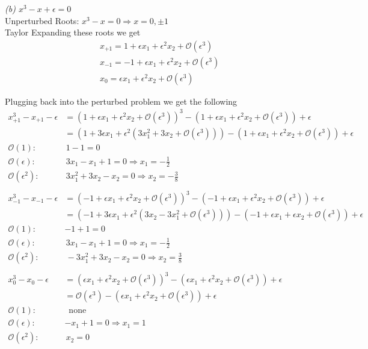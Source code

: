\documentclass[12pt]{article}
\theoremstyle{remark}
\begin{document}
\newpage

\textit{(b) $x^3 - x + \epsilon = 0$} \\

Unperturbed Roots: $x^3 - x = 0 \Rightarrow x = 0, \pm 1$ \\
Taylor Expanding these roots we get
\begin{align*}
 & x_{+1} = 1 + \epsilon x_1 + \epsilon^2 x_2 + \mathcal{O}(\epsilon^3) \\
 & x_{-1} = -1 + \epsilon x_1 + \epsilon^2 x_2 + \mathcal{O}(\epsilon^3) \\ 
 & x_{0} = \epsilon x_1 + \epsilon^2 x_2 + \mathcal{O}(\epsilon^3)  
\end{align*}

Plugging back into the perturbed problem we get the following  
\begin{align*}
	x_{+1}^3 - x_{+1} - \epsilon & = (1 + \epsilon x_1 + \epsilon^2 x_2 + \mathcal{O}(\epsilon^3))^3 - (1 + \epsilon x_1 + \epsilon^2 x_2 + \mathcal{O}(\epsilon^3)) + \epsilon \\
	& = (1 + 3\epsilon x_1 + \epsilon^2(3x_1^2 + 3x_2 + \mathcal{O}(\epsilon^3))) - (1 + \epsilon x_1 + \epsilon^2x_2 + \mathcal{O}(\epsilon^3)) + \epsilon \\
	\mathcal{O}(1): & \, 1- 1 = 0 \\
	\mathcal{O}(\epsilon): & \, 3x_1 - x_1 + 1 = 0 \Rightarrow x_1 = -\frac{1}{2} \\
	\mathcal{O}(\epsilon^2): & \, 3x_1^2 + 3x_2 - x_2 = 0 \Rightarrow x_2 = -\frac{3}{8} \\ \\
	x_{-1}^3 - x_{-1} - \epsilon & = (-1 + \epsilon x_1 + \epsilon^2 x_2 + \mathcal{O}(\epsilon^3))^3 - (-1 + \epsilon x_1 + \epsilon^2 x_2 + \mathcal{O}(\epsilon^3))  + \epsilon \\
	& = (-1 + 3\epsilon x_1 + \epsilon^2(3x_2 - 3x_1^2 + \mathcal{O}(\epsilon^3))) - (-1 + \epsilon x_1 + \epsilon x_2 + \mathcal{O}(\epsilon^3)) + \epsilon \\
	\mathcal{O}(1): & -1 + 1 = 0 \\
	\mathcal{O}(\epsilon): & \, 3x_1 - x_1 + 1 = 0 \Rightarrow x_1 = -\frac{1}{2} \\
	\mathcal{O}(\epsilon^2): & \, -3x_1^2 + 3x_2 - x_2 = 0 \Rightarrow x_2 = \frac{3}{8} \\ \\
	x_{0}^3 - x_{0} - \epsilon & = (\epsilon x_1 + \epsilon^2 x_2 + \mathcal{O}(\epsilon^3))^3 - (\epsilon x_1 + \epsilon^2 x_2 + \mathcal{O}(\epsilon^3)) + \epsilon \\
	& = \mathcal{O}(\epsilon^3) - (\epsilon x_1 + \epsilon^2 x_2 + \mathcal{O}(\epsilon^3)) + \epsilon \\
	\mathcal{O}(1): & \, \text{ none} \\
	\mathcal{O}(\epsilon): \,& -x_1 + 1 = 0 \Rightarrow x_1 = 1 \\
	\mathcal{O}(\epsilon^2): &\, x_2 = 0
\end{align*}
\end{document}
